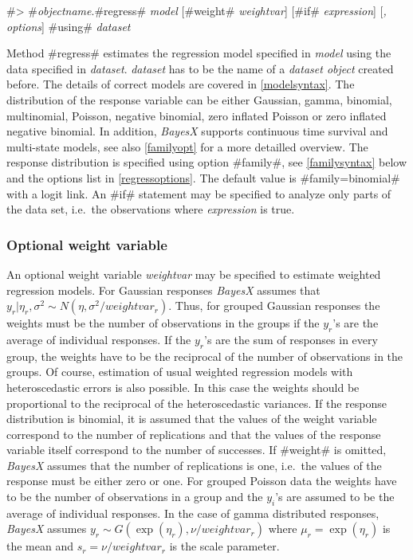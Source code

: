  #> #{\em objectname}.#regress# {\em model} [#weight# {\em weightvar}] [#if# {\em expression}] [{\em , options}] #using# {\em dataset}

Method #regress# estimates the regression model specified in {\em
model} using the data specified in {\em dataset}. {\em dataset}
has to be the name of a {\em dataset object} created before. The
details of correct models are covered in \autoref{modelsyntax}.
The distribution of the response variable can be either Gaussian,
gamma, binomial, multinomial, Poisson, negative binomial, zero
inflated Poisson or zero inflated negative binomial. In addition,
{\em BayesX} supports continuous time survival and multi-state
models, see also \autoref{familyopt} for a more detailled
overview. The response distribution is specified using option
#family#, see \autoref{familysyntax} below and the options list in
\autoref{regressoptions}. The default value is #family=binomial#
with a logit link. An #if# statement may be specified to analyze
only parts of the data set, i.e.~the observations where {\em
expression} is true.

\subsubsection{Optional weight variable}
\label{weightspecification}

An optional weight variable {\em weightvar} may be specified to
estimate weighted regression models. For Gaussian responses {\em
BayesX} assumes that $y_r|\eta_r,\sigma^2 \sim
N(\eta,\sigma^2/weightvar_r)$. Thus, for grouped Gaussian
responses the weights must be the number of observations in the
groups if the $y_r$'s are the average of individual responses. If
the $y_r$'s are the sum of responses in every group, the weights
have to be the reciprocal of the number of observations in the
groups. Of course, estimation of usual weighted regression models
with heteroscedastic errors is also possible. In this case the
weights should be proportional to the reciprocal of the
heteroscedastic variances. If the response distribution is
binomial, it is assumed that the values of the weight variable
correspond to the number of replications and that the values of
the response variable itself correspond to the number of
successes. If #weight# is omitted, {\em BayesX} assumes that the
number of replications is one, i.e.~the values of the response
must be either zero or one. For grouped Poisson data the weights
have to be the number of observations in a group and the $y_i$'s
are assumed to be the average of individual responses. In the case
of gamma distributed responses, {\em BayesX} assumes $y_r \sim
G(\exp(\eta_r),\nu/weightvar_r)$ where $\mu_r= \exp(\eta_r)$ is
the mean and $s_r = \nu/weightvar_r$ is the scale parameter.

